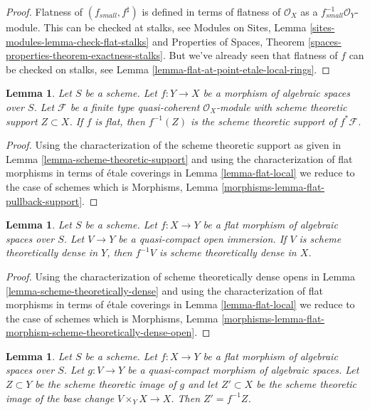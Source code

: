 \documentclass{stacks-project}
\theoremstyle{plain}
\newtheorem{lemma}[subsection]{Lemma}
\theoremstyle{definition}
\theoremstyle{remark}
\numberwithin{equation}{subsection}
\begin{document}
\begin{proof}
Flatness of $(f_{small}, f^\sharp)$ is defined in terms of
flatness of $\mathcal{O}_X$ as a $f_{small}^{-1}\mathcal{O}_Y$-module.
This can be checked at stalks, see
Modules on Sites, Lemma \ref{sites-modules-lemma-check-flat-stalks}
and
Properties of Spaces, Theorem \ref{spaces-properties-theorem-exactness-stalks}.
But we've already seen that flatness of $f$ can be checked on stalks, see
Lemma \ref{lemma-flat-at-point-etale-local-rings}.
\end{proof}

\begin{lemma}
\label{lemma-flat-pullback-support}
Let $S$ be a scheme. Let $f : Y \to X$ be a morphism of algebraic spaces
over $S$. Let $\mathcal{F}$ be a finite type quasi-coherent
$\mathcal{O}_X$-module with scheme theoretic support $Z \subset X$.
If $f$ is flat, then $f^{-1}(Z)$ is the scheme theoretic support of
$f^*\mathcal{F}$.
\end{lemma}

\begin{proof}
Using the characterization of the scheme theoretic support
as given in Lemma \ref{lemma-scheme-theoretic-support}
and using the characterization of flat morphisms in terms of
\'etale coverings in Lemma \ref{lemma-flat-local}
we reduce to the case of schemes which is
Morphisms, Lemma \ref{morphisms-lemma-flat-pullback-support}.
\end{proof}

\begin{lemma}
\label{lemma-flat-morphism-scheme-theoretically-dense-open}
Let $S$ be a scheme.
Let $f : X \to Y$ be a flat morphism of algebraic spaces over $S$.
Let $V \to Y$ be a quasi-compact open immersion. If $V$
is scheme theoretically dense in $Y$, then $f^{-1}V$
is scheme theoretically dense in $X$.
\end{lemma}

\begin{proof}
Using the characterization of scheme theoretically dense opens
in Lemma \ref{lemma-scheme-theoretically-dense}
and using the characterization of flat morphisms in terms of
\'etale coverings in Lemma \ref{lemma-flat-local}
we reduce to the case of schemes which is
Morphisms, Lemma
\ref{morphisms-lemma-flat-morphism-scheme-theoretically-dense-open}.
\end{proof}

\begin{lemma}
\label{lemma-flat-base-change-scheme-theoretic-image}
Let $S$ be a scheme. Let $f : X \to Y$ be a flat morphism of algebraic spaces
over $S$. Let $g : V \to Y$ be a quasi-compact morphism of algebraic spaces.
Let $Z \subset Y$ be the scheme theoretic image of $g$ and let $Z' \subset X$
be the scheme theoretic image of the base change $V \times_Y X \to X$.
Then $Z' = f^{-1}Z$.
\end{lemma}
\end{document}
